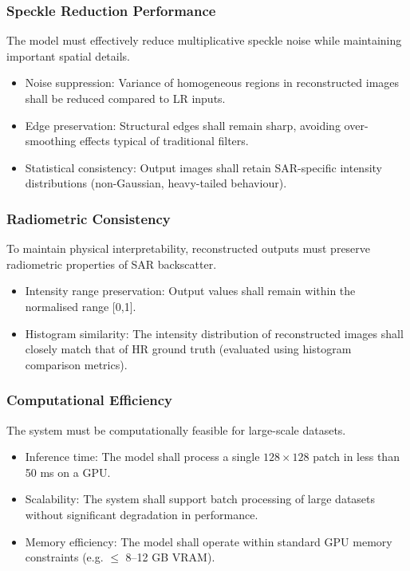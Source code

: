 \documentclass[conference]{IEEEtran}
\begin{document}
\subsubsection{Speckle Reduction Performance}

The model must effectively reduce multiplicative speckle noise while maintaining important spatial details.

\begin{itemize}
    \item Noise suppression: Variance of homogeneous regions in reconstructed images shall be reduced compared to LR inputs.
    \item Edge preservation: Structural edges shall remain sharp, avoiding over-smoothing effects typical of traditional filters.
    \item Statistical consistency: Output images shall retain SAR-specific intensity distributions (non-Gaussian, heavy-tailed behaviour).
\end{itemize}

\subsubsection{Radiometric Consistency}

To maintain physical interpretability, reconstructed outputs must preserve radiometric properties of SAR backscatter.

\begin{itemize}
    \item Intensity range preservation: Output values shall remain within the normalised range [0,1].
    \item Histogram similarity: The intensity distribution of reconstructed images shall closely match that of HR ground truth (evaluated using histogram comparison metrics).
\end{itemize}

\subsubsection{Computational Efficiency}

The system must be computationally feasible for large-scale datasets.

\begin{itemize}
    \item Inference time: The model shall process a single $128 \times 128$ patch in less than 50 ms on a GPU.
    \item Scalability: The system shall support batch processing of large datasets without significant degradation in performance.
    \item Memory efficiency: The model shall operate within standard GPU memory constraints (e.g. $\leq$ 8–12 GB VRAM).
\end{itemize}
\end{document}
